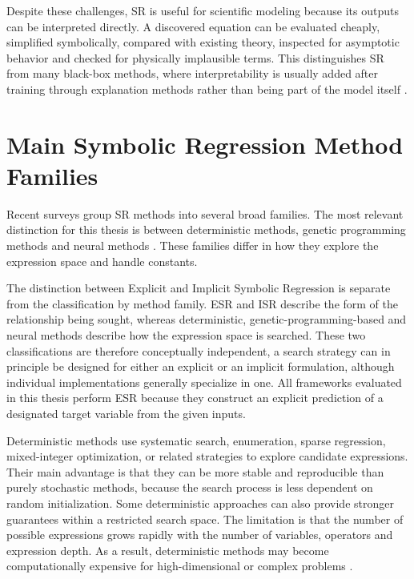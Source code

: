 \documentclass[12pt,oneside,bibtotoc,liststotoc]{scrbook}
\begin{document}
Despite these challenges, SR is useful for scientific modeling because its outputs can be interpreted directly. A discovered equation can be evaluated cheaply, simplified symbolically, compared with existing theory, inspected for asymptotic behavior and checked for physically implausible terms. This distinguishes SR from many black-box methods, where interpretability is usually added after training through explanation methods rather than being part of the model itself \cite{makke2024interpretable}.

\section{Main Symbolic Regression Method Families}

Recent surveys group SR methods into several broad families. The most relevant distinction for this thesis is between deterministic methods, genetic programming methods and neural methods \cite{dong2025recent}. These families differ in how they explore the expression space and handle constants.

The distinction between Explicit and Implicit Symbolic Regression is separate from the classification by method family. ESR and ISR describe the form of the relationship being sought, whereas deterministic, genetic-programming-based and neural methods describe how the expression space is searched. These two classifications are therefore conceptually independent, a search strategy can in principle be designed for either an explicit or an implicit formulation, although individual implementations generally specialize in one. All frameworks evaluated in this thesis perform ESR because they construct an explicit prediction of a designated target variable from the given inputs.

Deterministic methods use systematic search, enumeration, sparse regression, mixed-integer optimization, or related strategies to explore candidate expressions. Their main advantage is that they can be more stable and reproducible than purely stochastic methods, because the search process is less dependent on random initialization. Some deterministic approaches can also provide stronger guarantees within a restricted search space. The limitation is that the number of possible expressions grows rapidly with the number of variables, operators and expression depth. As a result, deterministic methods may become computationally expensive for high-dimensional or complex problems \cite{dong2025recent}.
\end{document}
